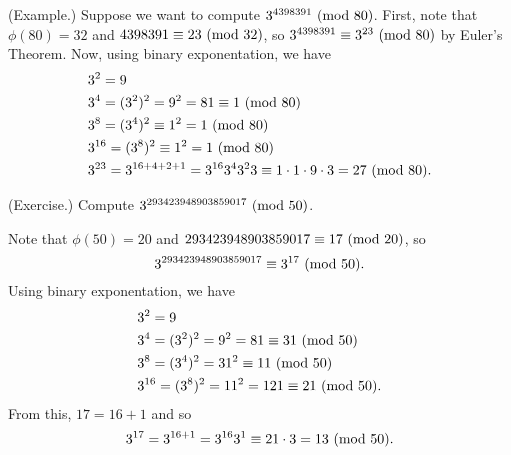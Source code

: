 \documentclass[letterpaper]{article}
\begin{document}
\begin{mdframed}
    (Example.) Suppose we want to compute $3^{4398391} \ (\mathrm{mod}\ 80)$. First, note that $\phi(80) = 32$ and $4398391 \equiv 23 \ (\mathrm{mod}\ 32)$, so $3^{4398391} \equiv 3^{23} \ (\mathrm{mod}\ 80)$ by Euler's Theorem. Now, using binary exponentation, we have 
    \begin{equation*}
        \begin{aligned}
            &3^2 = 9 \\ 
            &3^4 = (3^2)^2 = 9^2 = 81 \equiv 1 \ (\mathrm{mod}\ 80) \\ 
            &3^8 = (3^4)^2 \equiv 1^2 = 1 \ (\mathrm{mod}\ 80) \\ 
            &3^{16} = (3^8)^2 \equiv 1^2 = 1 \ (\mathrm{mod}\ 80) \\ 
            &3^{23} = 3^{16 + 4 + 2 + 1} = 3^{16}3^4 3^2 3 \equiv 1 \cdot 1 \cdot 9 \cdot 3 = 27 \ (\mathrm{mod}\ 80).
        \end{aligned}
    \end{equation*}
\end{mdframed}

\begin{mdframed}
    (Exercise.) Compute $3^{293423948903859017} \ (\mathrm{mod}\ 50)$. 

    \begin{mdframed}
        Note that $\phi(50) = 20$ and $293423948903859017 \equiv 17 \ (\mathrm{mod}\ 20)$, so 
        \[3^{293423948903859017} \equiv 3^{17} \ (\mathrm{mod}\ 50).\]
        Using binary exponentation, we have 
        \begin{equation*}
            \begin{aligned}
                &3^2 = 9 \\ 
                &3^4 = (3^2)^2 = 9^2 = 81 \equiv 31 \ (\mathrm{mod}\ 50) \\ 
                &3^8 = (3^4)^2 = 31^2 \equiv 11 \ (\mathrm{mod}\ 50) \\ 
                &3^{16} = (3^8)^2 = 11^2 = 121 \equiv 21 \ (\mathrm{mod}\ 50).
            \end{aligned}
        \end{equation*}
        From this, $17 = 16 + 1$ and so \[3^{17} = 3^{16 + 1} = 3^{16} 3^1 \equiv 21 \cdot 3 = 13 \ (\mathrm{mod}\ 50).\]
    \end{mdframed}
\end{mdframed}
\end{document}
